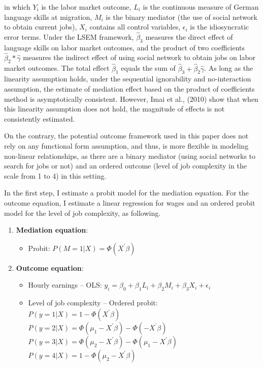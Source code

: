 \documentclass[12pt,a4paper]{article}
\begin{document}
in which $Y_{i}$ is the labor market outcome, $L_{i}$ is the continuous measure of German language skills at migration, $M_{i}$ is the binary mediator (the use of social network to obtain current jobs), $X_{i}$ contains all control variables, $\epsilon_{i}$ is the idiosyncratic error terms. Under the LSEM framework, $\hat \beta_{3}$ measures the direct effect of language skills on labor market outcomes, and the product of two coefficients $\hat \beta_{2}*\hat \gamma$ measures the indirect effect of using social network to obtain jobs on labor market outcomes. The total effect $\hat \beta_{1}$ equals the sum of $\hat \beta_{3} + \hat \beta_{2}\hat \gamma$. As long as the linearity assumption holds, under the sequential ignorability and no-interaction assumption, the estimate of mediation effect based on the product of coefficients method is asymptotically consistent. However, Imai et al., (2010) show that when this linearity assumption does not hold, the magnitude of effects is not consistently estimated. 

On the contrary, the potential outcome framework used in this paper does not rely on any functional form assumption, and thus, is more flexible in modeling non-linear relationships, as there are a binary mediator (using social networks to search for jobs or not) and an ordered outcome (level of job complexity in the scale from 1 to 4) in this setting.

In the first step, I estimate a probit model for the mediation equation. For the outcome equation, I estimate a linear regression for wages and an ordered probit model for the level of job complexity, as following.

\begin{enumerate}

\item \textbf{Mediation equation}: 

\begin{itemize}
\item Probit: $P(M = 1|X) = \Phi(X^{'}\beta)$
\end{itemize}

\item \textbf{Outcome equation}:
\begin{itemize}

\item Hourly earnings -- OLS: $y_{i} = \beta_{0} + \beta_{1}L_{i} + \beta_{2}M_{i} + \beta_{3}X_{i} + \epsilon_{i}$ \\

\item Level of job complexity -- Ordered probit: \\

$P(y = 1|X) = 1 - \Phi(X^{'}\beta)$ \\
$P(y = 2|X) = \Phi(\mu_{1} - X^{'}\beta) - \Phi(-X^{'}\beta)$ \\
$P(y = 3|X) = \Phi(\mu_{2} - X^{'}\beta) - \Phi(\mu_{1} - X^{'}\beta)$ \\
$P(y = 4|X) = 1 - \Phi(\mu_{2} - X^{'}\beta)$
\end{itemize}

\end{enumerate}
\end{document}

